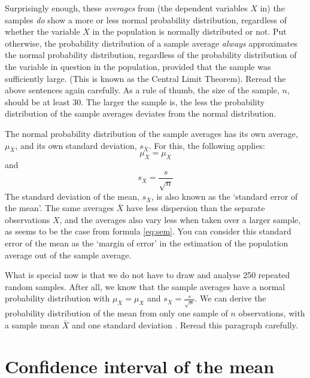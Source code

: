 \documentclass[
]{book}
\begin{document}
Surprisingly enough, these \emph{averages} from (the dependent variables
\(X\) in) the samples \emph{do} show a more or less normal probability distribution,
regardless of whether the variable \(X\) in the population is normally distributed or
not. Put otherwise, the probability distribution of a sample average \emph{always}
approximates the normal probability distribution, regardless of the probability
distribution of the variable in question in the population, provided that the sample
was sufficiently large. (This is known as the Central Limit Theorem). Reread the
above sentences again carefully. As a rule of thumb, the size of the sample, \(n\),
should be at least 30. The larger the sample is, the less the probability
distribution of the sample averages deviates from the normal distribution.

The normal probability distribution of the sample averages has its own average,
\(\mu_{\bar{X}}\), and its own standard deviation,
\(s_{\bar{X}}\). For this, the following applies:
\begin{equation}
    \mu_{\bar{X}} = \mu_X
    \label{eq:meanofmean}
\end{equation}
and
\begin{equation}
    s_{\bar{X}} = \frac{s}{\sqrt{n}}
    \label{eq:sem}
\end{equation}
The standard deviation of the
mean, \(s_{\bar{X}}\), is also known as the `standard error of
the mean'. The same averages \(\bar{X}\) have less dispersion than the separate
observations \(X\), and the averages also vary less when taken over a larger
sample, as seems to be the case from formula \eqref{eq:sem}. You can consider this
standard error of the mean as the `margin of error' in the estimation
of the population average out of the sample average.

What is special now is that we do not have to draw and analyse 250 repeated
random samples. After all, we know that the sample averages have a normal
probability distribution with
\(\mu_{\bar{X}} = \mu_X\) and \(s_{\bar{X}} = \frac{s}{\sqrt{n}}\). We can
derive the probability distribution of the mean from only one sample of
\(n\) observations, with a sample mean \(\bar{X}\) and one standard
deviation \citep{Cumm12}. Reread this paragraph carefully.

\hypertarget{sec:confidenceinterval-mean}{%
\section{Confidence interval of the mean}\label{sec:confidenceinterval-mean}}
\end{document}
